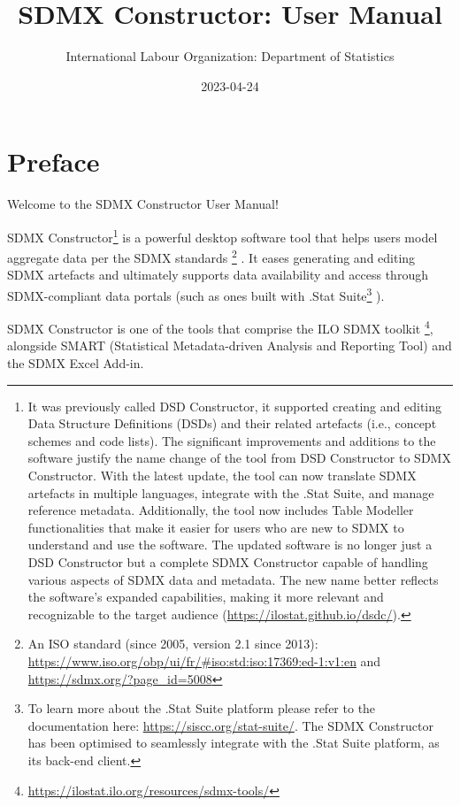 \documentclass[
]{book}
\title{SDMX Constructor: User Manual}
\author{International Labour Organization: Department of Statistics}
\date{2023-04-24}
\theoremstyle{definition}
\theoremstyle{definition}
\theoremstyle{definition}
\theoremstyle{definition}
\theoremstyle{remark}
\begin{document}
\maketitle

{
\setcounter{tocdepth}{1}
\tableofcontents
}
\hypertarget{preface}{%
\chapter*{Preface}\label{preface}}

Welcome to the SDMX Constructor User Manual!

SDMX Constructor\footnote{It was previously called DSD Constructor, it supported creating and editing Data Structure Definitions (DSDs) and their related artefacts (i.e., concept schemes and code lists). The significant improvements and additions to the software justify the name change of the tool from DSD Constructor to SDMX Constructor. With the latest update, the tool can now translate SDMX artefacts in multiple languages, integrate with the .Stat Suite, and manage reference metadata. Additionally, the tool now includes Table Modeller functionalities that make it easier for users who are new to SDMX to understand and use the software. The updated software is no longer just a DSD Constructor but a complete SDMX Constructor capable of handling various aspects of SDMX data and metadata. The new name better reflects the software's expanded capabilities, making it more relevant and recognizable to the target audience (\url{https://ilostat.github.io/dsdc/}).} is a powerful desktop software tool that helps users model aggregate data per the SDMX standards \footnote{An ISO standard (since 2005, version 2.1 since 2013): \url{https://www.iso.org/obp/ui/fr/\#iso:std:iso:17369:ed-1:v1:en} and \url{https://sdmx.org/?page_id=5008}} . It eases generating and editing SDMX artefacts and ultimately supports data availability and access through SDMX-compliant data portals (such as ones built with .Stat Suite\footnote{To learn more about the .Stat Suite platform please refer to the documentation here: \url{https://siscc.org/stat-suite/}. The SDMX Constructor has been optimised to seamlessly integrate with the .Stat Suite platform, as its back-end client.} ).

SDMX Constructor is one of the tools that comprise the ILO SDMX toolkit \footnote{\url{https://ilostat.ilo.org/resources/sdmx-tools/}}, alongside SMART (Statistical Metadata-driven Analysis and Reporting Tool) and the SDMX Excel Add-in.
\end{document}

